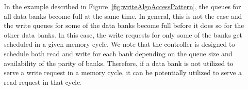 \begin{remark}
In the example described in Figure~\ref{fig:writeAlgoAccessPattern}, the queues for all data banks become full at the same time. In general, this is not the case and the write queues for some of the data banks become full before it does so for the other data banks. In this case, the write requests for only some of the banks get scheduled in a given memory cycle.{\color{blue} We note that the controller is designed to schedule both read and write for each bank depending on 
the queue size and availability of the parity of banks. Therefore, if a data bank is not utilized to serve a write request in a memory cycle, it can be potentially utilized to serve a read request in that cycle.} 
\end{remark}


